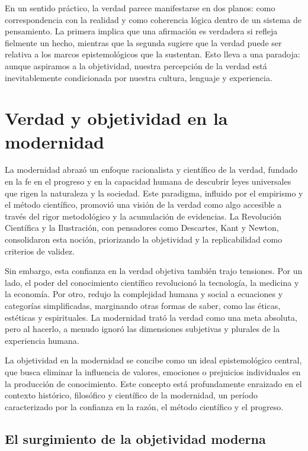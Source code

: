 \documentclass[
  letterpaper,
  DIV=11,
  numbers=noendperiod]{scrreprt}
\begin{document}
En un sentido práctico, la verdad parece manifestarse en dos planos:
como correspondencia con la realidad y como coherencia lógica dentro de
un sistema de pensamiento. La primera implica que una afirmación es
verdadera si refleja fielmente un hecho, mientras que la segunda sugiere
que la verdad puede ser relativa a los marcos epistemológicos que la
sustentan. Esto lleva a una paradoja: aunque aspiramos a la objetividad,
nuestra percepción de la verdad está inevitablemente condicionada por
nuestra cultura, lenguaje y experiencia.

\section{Verdad y objetividad en la
modernidad}\label{verdad-y-objetividad-en-la-modernidad}

La modernidad abrazó un enfoque racionalista y científico de la verdad,
fundado en la fe en el progreso y en la capacidad humana de descubrir
leyes universales que rigen la naturaleza y la sociedad. Este paradigma,
influido por el empirismo y el método científico, promovió una visión de
la verdad como algo accesible a través del rigor metodológico y la
acumulación de evidencias. La Revolución Científica y la Ilustración,
con pensadores como Descartes, Kant y Newton, consolidaron esta noción,
priorizando la objetividad y la replicabilidad como criterios de
validez.

Sin embargo, esta confianza en la verdad objetiva también trajo
tensiones. Por un lado, el poder del conocimiento científico revolucionó
la tecnología, la medicina y la economía. Por otro, redujo la
complejidad humana y social a ecuaciones y categorías simplificadas,
marginando otras formas de saber, como las éticas, estéticas y
espirituales. La modernidad trató la verdad como una meta absoluta, pero
al hacerlo, a menudo ignoró las dimensiones subjetivas y plurales de la
experiencia humana.

La objetividad en la modernidad se concibe como un ideal epistemológico
central, que busca eliminar la influencia de valores, emociones o
prejuicios individuales en la producción de conocimiento. Este concepto
está profundamente enraizado en el contexto histórico, filosófico y
científico de la modernidad, un período caracterizado por la confianza
en la razón, el método científico y el progreso.

\subsection{El surgimiento de la objetividad
moderna}\label{el-surgimiento-de-la-objetividad-moderna}
\end{document}
